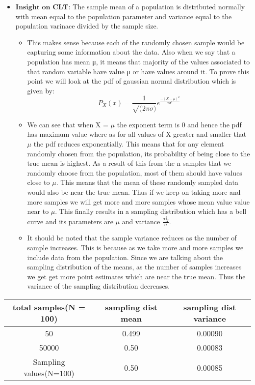 \documentclass[11pt]{article}
\providecommand{\tightlist}{%
      \setlength{\itemsep}{0pt}\setlength{\parskip}{0pt}}
\begin{document}
    \begin{itemize}
\tightlist
\item
  \(\textbf{Insight on CLT}\): The sample mean of a population is
  distributed normally with mean equal to the population parameter and
  variance equal to the population varinace divided by the sample size.

  \begin{itemize}
  \tightlist
  \item
    This makes sense because each of the randomly chosen sample would be
    capturing some information about the data. Also when we say that a
    population has mean μ, it means that majority of the values
    associated to that random variable have value μ or have values
    around it. To prove this point we will look at the pdf of gaussian
    normal distribution which is given by:
    \[P_X(x) = \frac{1}{\sqrt(2\pi\sigma)}e^\frac{-(X-\mu)^2}{2\sigma^2}\]
  \item
    We can see that when X = \(\mu\) the exponent term is 0 and hence
    the pdf has maximum value where as for all values of X greater and
    smaller that \(\mu\) the pdf reduces exponentially. This means that
    for any element randomly chosen from the population, its probability
    of being close to the true mean is highest. As a result of this from
    the n samples that we randomly choose from the population, most of
    them should have values close to \(\mu\). This means that the mean
    of these randomly sampled data would also be near the true mean.
    Thus if we keep on taking more and more samples we will get more and
    more samples whose mean value value near to \(\mu\). This finally
    results in a sampling distribution which has a bell curve and its
    parameters are \(\mu\) and variance \(\frac{\sigma_X^2}{n}\).
  \item
    It should be noted that the sample variance reduces as the number of
    sample increases. This is because as we take more and more samples
    we include data from the population. Since we are talking about the
    sampling distribution of the means, as the number of samples
    increases we get get more point estimates which are near the true
    mean. Thus the variance of the sampling distribution decreases.
  \end{itemize}
\end{itemize}

\begin{longtable}[]{@{}ccc@{}}
\toprule
total samples(N = 100) & sampling dist mean & sampling dist
variance\tabularnewline
\midrule
\endhead
50 & 0.499 & 0.00090\tabularnewline
50000 & 0.50 & 0.00083\tabularnewline
Sampling values(N=100) & 0.50 & 0.00085\tabularnewline
\bottomrule
\end{longtable}
\end{document}
